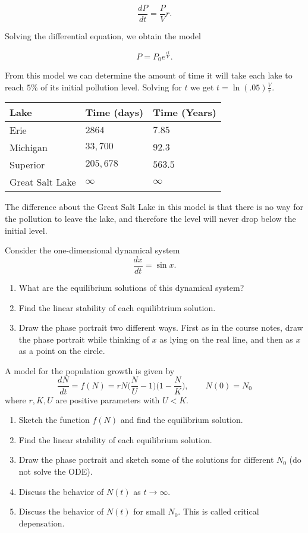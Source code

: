 \documentclass[12pt]{article}
\newenvironment{exercise}[2][Exercise]{\begin{trivlist}
\item[\hskip \labelsep {\bfseries #1}\hskip \labelsep {\bfseries #2.}]}{\end{trivlist}}
\begin{document}
\begin{exercise}{1}
$$\frac{dP}{dt} = \frac{P}{V}r.$$ 

Solving the differential equation, we obtain the model 

$$P = P_0 e^{\frac{rt}{V}}.$$

From this model we can determine the amount of time it will take each lake to reach $5\%$ of its initial pollution level. Solving for $t$ we get $t = \ln{(.05)} \frac{V}{r}.$
\begin{center}
	\begin{tabular}{lll}
		Lake & Time (days) & Time (Years) \\ \hline
		Erie & $2864$ & $7.85$ \\
		Michigan & $33,700$ & $92.3$ \\
		Superior & $205,678$ & $563.5$ \\
		Great Salt Lake & $\infty$ & $\infty$ \\
	\end{tabular}
\end{center}
The difference about the Great Salt Lake in this model is that there is no way for the pollution to leave the lake, and therefore the level will never drop below the initial level.

\end{exercise}
 
\begin{exercise}{2}
Consider the one-dimensional dynamical system 
$$\frac{dx}{dt} = \sin{x}.$$

\begin{enumerate}
\item[a)] What are the equilibrium solutions of this dynamical system?
\item[b)] Find the linear stability of each equilibtrium solution.
\item[c)] Draw the phase portrait two different ways. First as in the course notes, draw the phase portrait while thinking of $x$ as lying on the real line, and then as $x$ as a point on the circle.
\end{enumerate}
\end{exercise}

\begin{exercise}{3}
A model for the population growth is given by 
$$\frac{dN}{dt} = f(N) = rN \bigg( \frac{N}{U} - 1 \bigg)\bigg( 1 - \frac{N}{K} \bigg), \qquad N(0) = N_0$$
where $r, K, U$ are positive parameters with $U < K$.

\begin{enumerate}
\item[a)] Sketch the function $f(N)$ and find the equilibrium solution.
\item[b)] Find the linear stability of each equilibrium solution.
\item[c)] Draw the phase portrait and sketch some of the solutions for different $N_0$ (do not solve the ODE).
\item[d)] Discuss the behavior of $N(t)$ as $t \rightarrow \infty$.
\item[e)] Discuss the behavior of $N(t)$ for small $N_0$. This is called critical depensation.
\end{enumerate}
\end{exercise}

 
\end{document}
